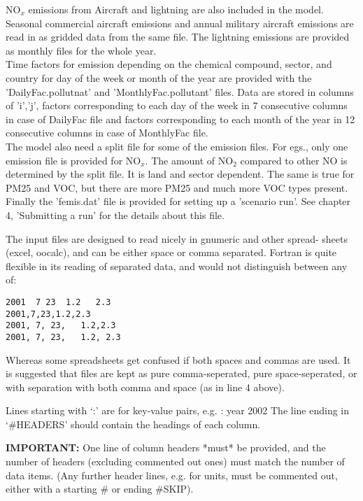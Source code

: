 NO$_{x}$ emissions from Aircraft and lightning are also included in the
model. Seasonal commercial aircraft emissions and annual military
aircraft emissions are read in as gridded data from the same file.
The lightning emissions are provided as monthly files for the whole
year.      \\

Time factors for emission depending on the chemical compound, sector,
and country for day of the week or month of the year are provided with
the 'DailyFac.pollutnat' and 'MonthlyFac.pollutant' files.  Data are
stored in columns of 'i','j', factors corresponding to each day of the
week in 7 consecutive columns in case of DailyFac file and factors
corresponding to each month of the year in 12 consecutive columns in
case of MonthlyFac file.\\  

The model also need a split file for some of the emission files.  For
egs., only one emission file is provided for NO$_{x}$.  The amount of
NO$_{2}$ compared to other NO is determined by the split file.  It is
land and sector dependent.  The same is true for PM25 and VOC, but
there are more PM25 and much more VOC types present. \\ 

Finally the 'femis.dat' file is provided for setting up a 'scenario run'.  See
chapter 4, 'Submitting a run' for the details about this file.  

 
\bigskip

 The input files are designed to read nicely in gnumeric and other spread-
 sheets (excel, oocalc), and can be either space or comma separated.
 Fortran is quite flexible in its reading of separated data, and
would not distinguish between any of:
\begin{verbatim}
2001  7 23  1.2   2.3
2001,7,23,1.2,2.3
2001, 7, 23,   1.2,2.3
2001, 7, 23,   1.2, 2.3
\end{verbatim}

Whereas some spreadsheets get confused if both spaces and commas
are used. It is suggested that files are kept as 
pure comma-seperated,
pure space-seperated,
or with separation with both comma and space (as in line 4 above).
\bigskip

Lines starting with `:' are for key-value pairs, e.g. : year 2002
The line ending in `\#HEADERS' should contain the headings of each column.
\bigskip

{\bf IMPORTANT:} One line of column headers *must* be provided, and the
 number of headers (excluding commented out ones)  must match the number of data items.
(Any further header lines, e.g. for units, must be commented out, either with
a starting \# or ending \#SKIP).

